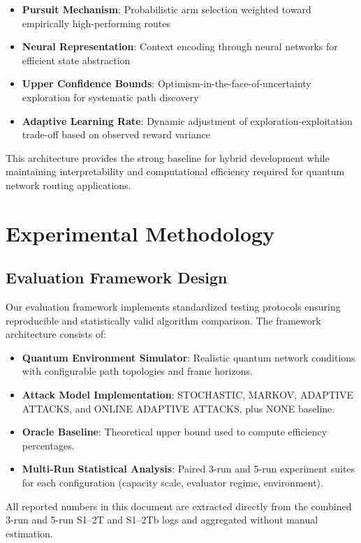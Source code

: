 \documentclass[12pt,a4paper]{article}
\begin{document}
\begin{itemize}
\item \textbf{Pursuit Mechanism}: Probabilistic arm selection weighted toward empirically high-performing routes
\item \textbf{Neural Representation}: Context encoding through neural networks for efficient state abstraction
\item \textbf{Upper Confidence Bounds}: Optimism-in-the-face-of-uncertainty exploration for systematic path discovery
\item \textbf{Adaptive Learning Rate}: Dynamic adjustment of exploration-exploitation trade-off based on observed reward variance
\end{itemize}

This architecture provides the strong baseline for hybrid development while maintaining interpretability and computational efficiency required for quantum network routing applications.

\section{Experimental Methodology}

\subsection{Evaluation Framework Design}

Our evaluation framework implements standardized testing protocols ensuring reproducible and statistically valid algorithm comparison. The framework architecture consists of:

\begin{itemize}
\item \textbf{Quantum Environment Simulator}: Realistic quantum network conditions with configurable path topologies and frame horizons.
\item \textbf{Attack Model Implementation}: STOCHASTIC, MARKOV, ADAPTIVE ATTACKS, and ONLINE ADAPTIVE ATTACKS, plus NONE baseline.
\item \textbf{Oracle Baseline}: Theoretical upper bound used to compute efficiency percentages.
\item \textbf{Multi-Run Statistical Analysis}: Paired 3-run and 5-run experiment suites for each configuration (capacity scale, evaluator regime, environment).
\end{itemize}

All reported numbers in this document are extracted directly from the combined 3-run and 5-run S1–2T and S1–2Tb logs and aggregated without manual estimation.
\end{document}
